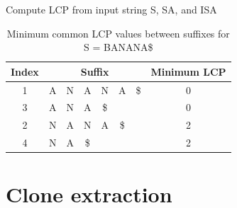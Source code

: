\begin{algorithm}[t]
  \SetAlgoLined\DontPrintSemicolon

  \vspace{0.5cm}
  \caption{Compute LCP from input string S, SA, and ISA}
  \label{alg:lcp}
\end{algorithm}

\begin{table}[t]
    \begin{center}
        \begin{tabular}[c]{c|cccccc|c}
            Index & \multicolumn{6}{c}{Suffix} & Minimum LCP \\
            \hline
            1 & A & N & A & N & A & \$ & 0 \\ 
            3 & A & N & A & \$ &  &  & 0\\ 
            2 & N & A & N & A & \$ & & 2 \\ 
            4 & N & A & \$ & & &  & 2\\ 

        \end{tabular}
    \end{center}
    \caption{Minimum common LCP values between suffixes for S = BANANA\$}
    \label{tab:lcpexample}
\end{table}

\section{Clone extraction}


